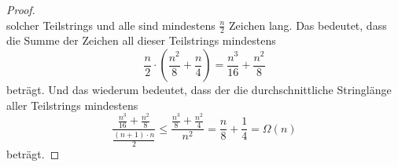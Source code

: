 \documentclass[11pt,a4paper]{article}
\begin{document}
\begin{loesung}
\begin{enumerate}
\begin{proof}
\begin{equation*}
            \end{equation*}
            solcher Teilstrings und alle sind mindestens $\frac{n}{2}$ Zeichen lang.
            Das bedeutet, dass die Summe der Zeichen all dieser Teilstrings mindestens
            \begin{equation*}
                \frac{n}{2} \cdot \left( \frac{n^2}{8} + \frac{n}{4} \right) = \frac{n^3}{16} + \frac{n^2}{8}
            \end{equation*}
            beträgt. Und das wiederum bedeutet, dass der die durchschnittliche Stringlänge aller Teilstrings mindestens 
            \begin{equation*}
                \frac{\frac{n^3}{16} + \frac{n^2}{8}}{\frac{(n + 1) \cdot n}{2} }
                \leq 
                \frac{\frac{n^3}{8} + \frac{n^2}{4}}{n^2} = \frac{n}{8} + \frac{1}{4} = \Omega(n)
            \end{equation*}
            beträgt.
        \end{proof}


\end{enumerate}
\end{loesung}
\end{document}
